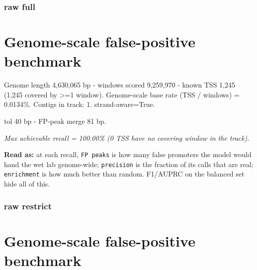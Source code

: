 \documentclass[10pt]{article}
\begin{document}
\subsubsection*{raw \textperiodcentered{} full}
\section*{Genome-scale false-positive benchmark}

Genome length 4,630,065 bp - windows scored 9,259,970 - known TSS 1,245 (1,245 covered by >=1 window). Genome-scale base rate (TSS / windows) = 0.0134\%. Contigs in track: 1. strand-aware=True.

tol 40 bp - FP-peak merge 81 bp.

\begin{center}
\end{center}

{\itshape Max achievable recall = 100.00\% (0 TSS have no covering window in the track).}

\textbf{Read as:} at each recall, \texttt{FP peaks} is how many false promoters the model would hand the wet lab genome-wide; \texttt{precision} is the fraction of its calls that are real; \texttt{enrichment} is how much better than random. F1/AUPRC on the balanced set hide all of this.

\subsubsection*{raw \textperiodcentered{} restrict}
\section*{Genome-scale false-positive benchmark}
\end{document}
